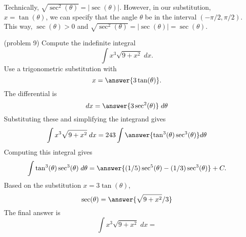 \documentclass{ximera}
\begin{document}
\begin{remark}
Technically, $\sqrt{\sec^2(\theta)} = |\sec(\theta)|$. However, in our substitution, $x = \tan(\theta)$,
we can specify that the angle $\theta$ be in the interval $(-\pi/2, \pi/2)$. This way, 
$\sec(\theta) > 0$ and $\sqrt{\sec^2(\theta)} = |\sec(\theta)| = \sec(\theta)$.
\end{remark}




\begin{problem}(problem 9)
Compute the indefinite integral
\[
\int   x^3\sqrt{9 + x^2}\; dx.
\]
Use a trigonometric substitution with\\
\[
x = \answer{3\tan(\theta)}.
\]
The differential is\\
\[
dx = \answer{3\sec^2(\theta)} \; d\theta
\]
Substituting these and simplifying the integrand gives\\
\[
\int   x^3\sqrt{9 + x^2}\; dx = 243\int \answer{\tan^3(\theta)\sec^3(\theta)} d\theta
\]
Computing this integral gives
\[
\int \tan^3(\theta)\sec^3(\theta) \; d\theta = \answer{(1/5)\sec^5(\theta) - (1/3)\sec^3(\theta)} + C.
\]
Based on the substitution $x = 3\tan(\theta)$, \\
\[
\sec(\theta) = \answer{\sqrt{9+x^2}/3}
\]
The final answer is
\[
\int   x^3\sqrt{9 + x^2}\; dx = 
\]
\begin{center}
\begin{multipleChoice}
\end{multipleChoice}
\end{center}
\end{problem}
\end{document}
